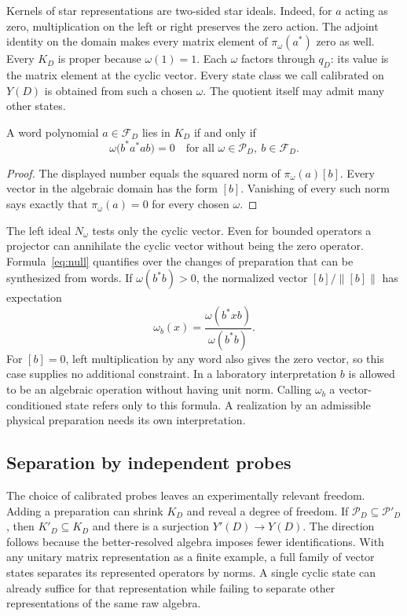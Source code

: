 \documentclass[11pt,letterpaper]{article}
\newcommand{\F}{\mathcal F}
\newcommand{\Probes}{\mathcal P}
\begin{document}
Kernels of star representations are two-sided star ideals. Indeed, for $a$ acting as zero, multiplication on the left or right preserves the zero action. The adjoint identity on the domain makes every matrix element of $\pi_\omega(a^*)$ zero as well. Every $K_D$ is proper because $\omega(1)=1$. Each $\omega$ factors through $q_D$: its value is the matrix element at the cyclic vector. Every state class we call calibrated on $Y(D)$ is obtained from such a chosen $\omega$. The quotient itself may admit many other states.

\begin{lemma}\label{lem:null}
A word polynomial $a\in\F_D$ lies in $K_D$ if and only if
\begin{equation}
  \omega\big(b^*a^*ab\big)=0
             \quad\text{for all }\omega\in\Probes_D,\ b\in\F_D .
                                                        \label{eq:null}
\end{equation}
\end{lemma}
\begin{proof}
The displayed number equals the squared norm of $\pi_\omega(a)[b]$. Every vector in the algebraic domain has the form $[b]$. Vanishing of every such norm says exactly that $\pi_\omega(a)=0$ for every chosen $\omega$.
\end{proof}

The left ideal $N_\omega$ tests only the cyclic vector. Even for bounded operators a projector can annihilate the cyclic vector without being the zero operator. Formula~\eqref{eq:null} quantifies over the changes of preparation that can be synthesized from words. If $\omega(b^*b)>0$, the normalized vector $[b]/\|[b]\|$ has expectation
\[
 \omega_b(x)=\frac{\omega(b^*xb)}{\omega(b^*b)} .
\]
For $[b]=0$, left multiplication by any word also gives the zero vector, so this case supplies no additional constraint. In a laboratory interpretation $b$ is allowed to be an algebraic operation without having unit norm. Calling $\omega_b$ a vector-conditioned state refers only to this formula. A realization by an admissible physical preparation needs its own interpretation.

\subsection{Separation by independent probes}

The choice of calibrated probes leaves an experimentally relevant freedom. Adding a preparation can shrink $K_D$ and reveal a degree of freedom. If $\Probes_D\subseteq\Probes'_D$, then $K'_D\subseteq K_D$ and there is a surjection $Y'(D)\to Y(D)$. The direction follows because the better-resolved algebra imposes fewer identifications. With any unitary matrix representation as a finite example, a full family of vector states separates its represented operators by norms. A single cyclic state can already suffice for that representation while failing to separate other representations of the same raw algebra.
\end{document}
